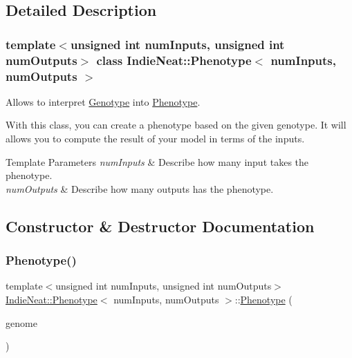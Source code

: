 \subsection{Detailed Description}
\subsubsection*{template$<$unsigned int num\+Inputs, unsigned int num\+Outputs$>$\newline
class Indie\+Neat\+::\+Phenotype$<$ num\+Inputs, num\+Outputs $>$}

Allows to interpret \hyperlink{class_indie_neat_1_1_genotype}{Genotype} into \hyperlink{class_indie_neat_1_1_phenotype}{Phenotype}. 

With this class, you can create a phenotype based on the given genotype. It will allows you to compute the result of your model in terms of the inputs. 
\begin{DoxyTemplParams}{Template Parameters}
{\em num\+Inputs} & Describe how many input takes the phenotype. \\
\hline
{\em num\+Outputs} & Describe how many outputs has the phenotype. \\
\hline
\end{DoxyTemplParams}


\subsection{Constructor \& Destructor Documentation}
\mbox{\label{class_indie_neat_1_1_phenotype_a073fe9386602c8cce9dac9fc78bbce35}} 
\subsubsection{\texorpdfstring{Phenotype()}{Phenotype()}}
{\footnotesize\ttfamily template$<$unsigned int num\+Inputs, unsigned int num\+Outputs$>$ \\
\hyperlink{class_indie_neat_1_1_phenotype}{Indie\+Neat\+::\+Phenotype}$<$ num\+Inputs, num\+Outputs $>$\+::\hyperlink{class_indie_neat_1_1_phenotype}{Phenotype} (\begin{DoxyParamCaption}\item[{\hyperlink{class_indie_neat_1_1_genotype}{Genotype}$<$ num\+Inputs, num\+Outputs $>$ const \&}]{genome }\end{DoxyParamCaption})\hspace{0.3cm}{\ttfamily [inline]}}



